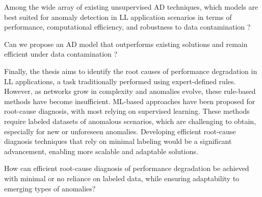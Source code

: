  {Among the wide array of existing unsupervised AD techniques, which models are best suited for anomaly detection in \ac{LL} application scenarios in terms of performance, computational efficiency, and robustness to data contamination ? }

 {Can we propose an AD model that outperforms existing solutions and remain efficient under data contamination ?
}

Finally, the thesis aims to identify the root causes of performance degradation in \ac{LL} applications, a task traditionally performed using expert-defined rules. However, as networks grow in complexity and anomalies evolve, these rule-based methods have become insufficient. ML-based approaches have been proposed for root-cause diagnosis, with most relying on supervised learning. These methods require labeled datasets of anomalous scenarios, which are challenging to obtain, especially for new or unforeseen anomalies. Developing efficient root-cause diagnosis techniques that rely on minimal labeling would be a significant advancement, enabling more scalable and adaptable solutions.

 {How can efficient root-cause diagnosis of performance degradation be achieved with minimal or no reliance on labeled data, while ensuring adaptability to emerging types of anomalies?}


